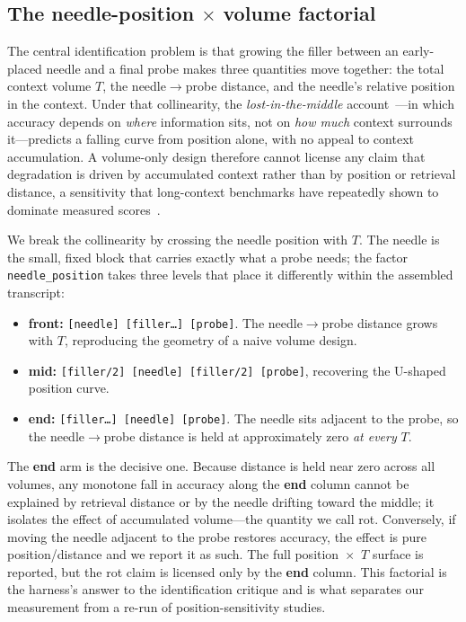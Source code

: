 \documentclass[11pt]{article}
\begin{document}
\subsection{The needle-position $\times$ volume factorial}
\label{sec:method:factorial}

The central identification problem is that growing the filler between an early-placed needle and
a final probe makes three quantities move together: the total context volume $T$, the
needle$\to$probe distance, and the needle's relative position in the context. Under that
collinearity, the \emph{lost-in-the-middle} account~\cite{liu2024lostmiddle}---in which accuracy
depends on \emph{where} information sits, not on \emph{how much} context surrounds it---predicts a
falling curve from position alone, with no appeal to context accumulation. A volume-only design
therefore cannot license any claim that degradation is driven by accumulated context rather than
by position or retrieval distance, a sensitivity that long-context benchmarks have repeatedly
shown to dominate measured scores~\cite{liu2024lostmiddle,hsieh2024ruler,hong2025contextrot}.

We break the collinearity by crossing the needle position with $T$. The needle is the small,
fixed block that carries exactly what a probe needs; the factor \texttt{needle\_position} takes
three levels that place it differently within the assembled transcript:
\begin{itemize}
  \item \textbf{front:} \texttt{[needle]\,[filler\ldots]\,[probe]}. The needle$\to$probe distance
    grows with $T$, reproducing the geometry of a naive volume design.
  \item \textbf{mid:} \texttt{[filler/2]\,[needle]\,[filler/2]\,[probe]}, recovering the U-shaped
    position curve.
  \item \textbf{end:} \texttt{[filler\ldots]\,[needle]\,[probe]}. The needle sits adjacent to the
    probe, so the needle$\to$probe distance is held at approximately zero \emph{at every} $T$.
\end{itemize}
The \textbf{end} arm is the decisive one. Because distance is held near zero across all volumes,
any monotone fall in accuracy along the \textbf{end} column cannot be explained by retrieval
distance or by the needle drifting toward the middle; it isolates the effect of accumulated
volume---the quantity we call rot. Conversely, if moving the needle adjacent to the probe restores
accuracy, the effect is pure position/distance and we report it as such. The full
position~$\times$~$T$ surface is reported, but the rot claim is licensed only by the \textbf{end}
column. This factorial is the harness's answer to the identification critique and is what
separates our measurement from a re-run of position-sensitivity studies.
\end{document}
